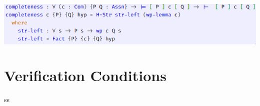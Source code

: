 
\begin{center}
  \includegraphics[scale = 0.5]{images/IMP/completezza.png}
\end{center}

\section{Verification Conditions}

ss













